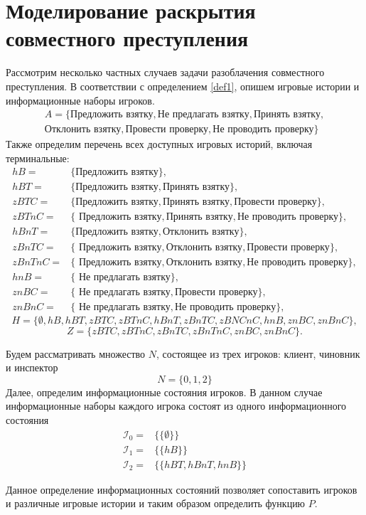 \section{Моделирование раскрытия совместного преступления}

Рассмотрим несколько частных случаев задачи разоблачения совместного преступления. В соответствии с определением \ref{def1}, опишем игровые истории и информационные наборы игроков.
\begin{align*}
	A = \{\text{Предложить взятку}, \text{Не предлагать взятку}, \text{Принять взятку}, \\ \text{Отклонить взятку}, \text{Провести проверку}, \text{Не проводить проверку} \}
\end{align*}
Также определим перечень всех доступных игровых историй, включая терминальные:
\begin{align*}
hB = & \{\text{Предложить взятку}\}, \\
hBT = & \{\text{Предложить взятку}, \text{Принять взятку}\}, \\
zBTC = & \{\text{Предложить взятку}, \text{Принять взятку}, \text{Провести проверку}\}, \\
zBTnC = & \{\text{ Предложить взятку}, \text{Принять взятку}, \text{Не проводить проверку}\}, \\
hBnT = & \{ \text{Предложить взятку}, \text{Отклонить взятку} \}, \\
zBnTC = & \{\text{ Предложить взятку}, \text{Отклонить взятку}, \text{Провести проверку}\}, \\
zBnTnC = & \{\text{ Предложить взятку}, \text{Отклонить взятку}, \text{Не проводить проверку}\}, \\
hnB = & \{\text{ Не предлагать взятку}\}, \\
znBC = & \{\text{ Не предлагать взятку}, \text{Провести проверку}\}, \\
znBnC = & \{\text{ Не предлагать взятку}, \text{Не проводить проверку}\},
\end{align*}
\begin{equation*}
	H = \{\emptyset, hB, hBT, zBTC, zBTnC, hBnT, zBnTC, zBNCnC, hnB, znBC, znBnC\},
\end{equation*}
\begin{equation}
Z = \{zBTC, zBTnC, zBnTC, zBnTnC, znBC, znBnC\}.
\end{equation}
\par
Будем рассматривать множество $N$, состоящее из трех игроков: клиент, чиновник и инспектор
\begin{equation*}
N = \{0, 1, 2\}
\end{equation*}
Далее, определим информационные состояния игроков. В данном случае информационные наборы каждого игрока состоят из одного информационного состояния
\begin{align*}
\mathcal{I}_0 = & \{\{\emptyset\}\} \\
\mathcal{I}_1 = & \{\{hB\}\} \\
\mathcal{I}_2 = & \{\{hBT, hBnT, hnB\}\}
\end{align*}
\par
Данное определение информационных состояний позволяет сопоставить игроков и различные игровые истории и таким образом определить функцию $P$.

